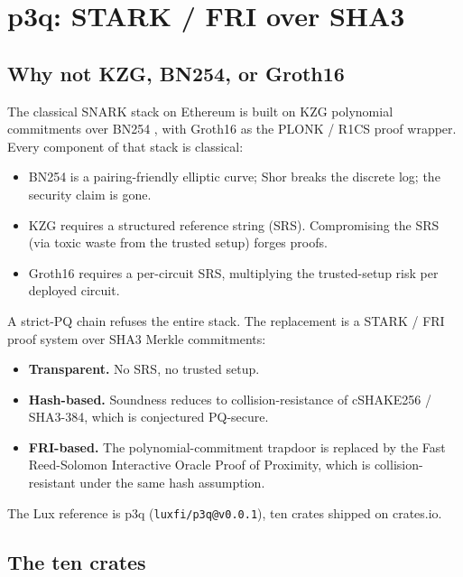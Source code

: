 \section{p3q: STARK / FRI over SHA3}
\label{sec:p3q}

\subsection{Why not KZG, BN254, or Groth16}

The classical SNARK stack on Ethereum is built on KZG polynomial commitments
\cite{kzg2010} over BN254 \cite{bn254}, with Groth16 \cite{groth2016} as the
PLONK / R1CS proof wrapper. Every component of that stack is classical:

\begin{itemize}[leftmargin=2em,nosep]
  \item BN254 is a pairing-friendly elliptic curve; Shor breaks the
    discrete log; the security claim is gone.
  \item KZG requires a structured reference string (SRS). Compromising the
    SRS (via toxic waste from the trusted setup) forges proofs.
  \item Groth16 requires a per-circuit SRS, multiplying the trusted-setup
    risk per deployed circuit.
\end{itemize}

A strict-PQ chain refuses the entire stack. The replacement is a
STARK / FRI proof system over SHA3 Merkle commitments:

\begin{itemize}[leftmargin=2em,nosep]
  \item \textbf{Transparent.} No SRS, no trusted setup.
  \item \textbf{Hash-based.} Soundness reduces to collision-resistance of
    cSHAKE256 / SHA3-384, which is conjectured PQ-secure.
  \item \textbf{FRI-based.} The polynomial-commitment trapdoor is replaced
    by the Fast Reed-Solomon Interactive Oracle Proof of Proximity, which
    is collision-resistant under the same hash assumption.
\end{itemize}

The Lux reference is p3q (\texttt{luxfi/p3q@v0.0.1}), ten crates shipped on
crates.io.

\subsection{The ten crates}

